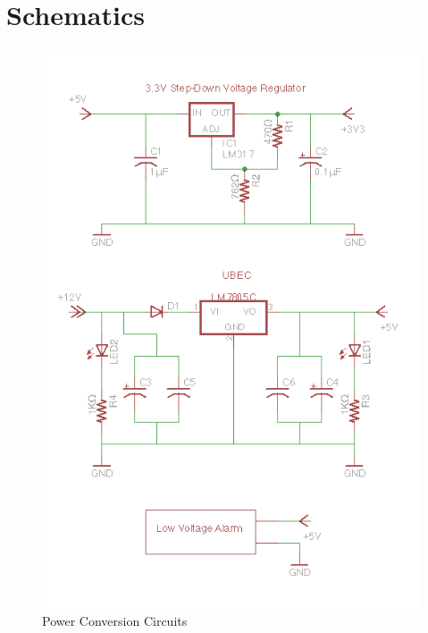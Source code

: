 \section{Schematics}
\begin{figure}[htb]
\begin{center}
\includegraphics{powerschem}
\caption{Power Conversion Circuits}
\end{center}
\end{figure}

